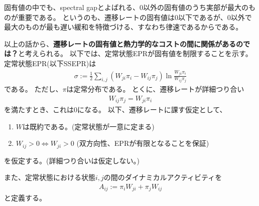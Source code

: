 \documentclass[a4paper,11pt]{jsarticle}
\numberwithin{equation}{section}
\begin{document}
固有値の中でも、spectral gapとよばれる、$0$以外の固有値のうち実部が最大のものが重要である。
というのも、遷移レートの固有値は0以下であるが、0以外で最大のものが最も遅い緩和を特徴づける、すなわち律速であるからである。

以上の話から、\textbf{遷移レートの固有値と熱力学的なコストの間に関係があるのでは？}と考えられる。
以下では、定常状態EPRが固有値を制限することを示す。\\

定常状態EPR(以下SSEPR)は
\begin{align}
    \sigma := \frac{1}{2} \sum_{i,j} (W_{ji} \pi_i - W_{ij} \pi_j) \ln \frac{W_{ji} \pi_i}{W_{ij} \pi_j}
\end{align}
である。
ただし、$\pi$は定常分布である。
とくに、遷移レートが詳細つり合い
\begin{align}
    W_{ij} \pi_j = W_{ji} \pi_i
\end{align}
を満たすとき、これは$0$になる。
以下、遷移レートに課す仮定として、
\begin{enumerate}
    \item $W$は既約である。(定常状態が一意に定まる)
    \item $W_{ij} > 0 \Leftrightarrow W_{ji} > 0$ (双方向性、EPRが有限となることを保証)
\end{enumerate}
を仮定する。(詳細つり合いは仮定しない。)

また、定常状態における状態$i,j$の間のダイナミカルアクティビティを
\begin{align}
    A_{ij} := \pi_i W_{ji} + \pi_j W_{ij}
\end{align}
と定義する。
\end{document}
